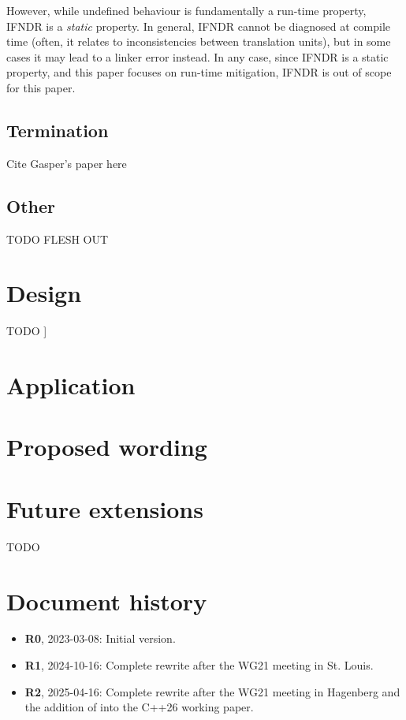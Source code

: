 However, while undefined behaviour is fundamentally a run-time property, IFNDR is a \emph{static} property. In general, IFNDR cannot be diagnosed at compile time (often, it relates to inconsistencies between translation units), but in some cases it may lead to a linker error instead. In any case, since IFNDR is a static property, and this paper focuses on run-time mitigation, IFNDR is out of scope for this paper.

\subsection{Termination}

Cite Gasper's paper here

\subsection{Other}

TODO FLESH OUT


\section{Design}
\label{design}

TODO
]

\section{Application}
\label{application}


\section{Proposed wording}
\label{wording}

\section{Future extensions}
\label{extensions}


TODO

\section*{Document history}
\begin{itemize}
\item \textbf{R0}, 2023-03-08: Initial version.
\item \textbf{R1}, 2024-10-16: Complete rewrite after the WG21 meeting in St. Louis.
\item \textbf{R2}, 2025-04-16: Complete rewrite after the WG21 meeting in Hagenberg and the addition of \cite{P2900R14} into the C++26 working paper.
\end{itemize}

